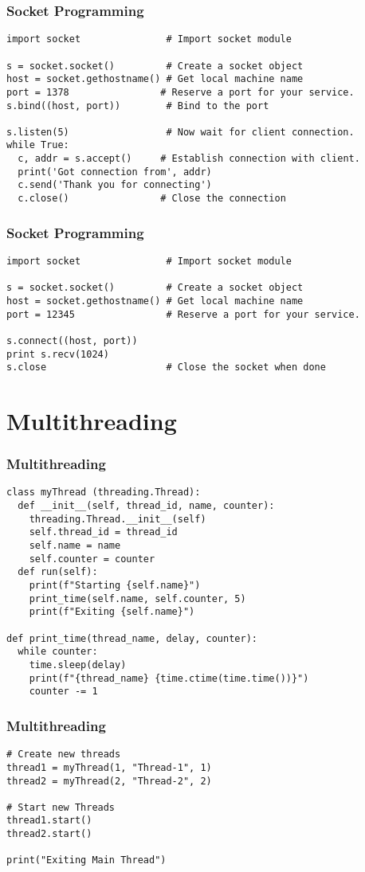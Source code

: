 \documentclass{../py-lecture}
\begin{document}
\begin{frame}[fragile]
	\frametitle{Socket Programming}
    \begin{verbatim}
import socket               # Import socket module

s = socket.socket()         # Create a socket object
host = socket.gethostname() # Get local machine name
port = 1378                # Reserve a port for your service.
s.bind((host, port))        # Bind to the port

s.listen(5)                 # Now wait for client connection.
while True:
  c, addr = s.accept()     # Establish connection with client.
  print('Got connection from', addr)
  c.send('Thank you for connecting')
  c.close()                # Close the connection
    \end{verbatim}
\end{frame}

\begin{frame}[fragile]
	\frametitle{Socket Programming}
  \begin{verbatim}
import socket               # Import socket module

s = socket.socket()         # Create a socket object
host = socket.gethostname() # Get local machine name
port = 12345                # Reserve a port for your service.

s.connect((host, port))
print s.recv(1024)
s.close                     # Close the socket when done
  \end{verbatim}
\end{frame}

\section{Multithreading}

\begin{frame}[fragile]
	\frametitle{Multithreading}
  \begin{verbatim}
class myThread (threading.Thread):
  def __init__(self, thread_id, name, counter):
    threading.Thread.__init__(self)
    self.thread_id = thread_id
    self.name = name
    self.counter = counter
  def run(self):
    print(f"Starting {self.name}")
    print_time(self.name, self.counter, 5)
    print(f"Exiting {self.name}")

def print_time(thread_name, delay, counter):
  while counter:
    time.sleep(delay)
    print(f"{thread_name} {time.ctime(time.time())}")
    counter -= 1
  \end{verbatim}
\end{frame}

\begin{frame}[fragile]
	\frametitle{Multithreading}
  \begin{verbatim}
# Create new threads
thread1 = myThread(1, "Thread-1", 1)
thread2 = myThread(2, "Thread-2", 2)

# Start new Threads
thread1.start()
thread2.start()

print("Exiting Main Thread")
  \end{verbatim}
\end{frame}
\end{document}
